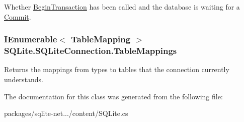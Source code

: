 Whether \hyperlink{classSQLite_1_1SQLiteConnection_aba3becdb524808bd49f349587f1b7049}{Begin\-Transaction} has been called and the database is waiting for a \hyperlink{classSQLite_1_1SQLiteConnection_a2c8187a19b5065f6b23c079e7cca29fe}{Commit}. 

\hypertarget{classSQLite_1_1SQLiteConnection_a72dd4f277b04c171222a199744aef32b}{
\subsubsection[{Table\-Mappings}]{\setlength{\rightskip}{0pt plus 5cm}I\-Enumerable$<$ {\bf Table\-Mapping} $>$ S\-Q\-Lite.\-S\-Q\-Lite\-Connection.\-Table\-Mappings\hspace{0.3cm}{\ttfamily [get]}}}\label{classSQLite_1_1SQLiteConnection_a72dd4f277b04c171222a199744aef32b}


Returns the mappings from types to tables that the connection currently understands. 



The documentation for this class was generated from the following file\-:\begin{DoxyCompactItemize}
\item 
packages/sqlite-\/net.../content/S\-Q\-Lite.\-cs\end{DoxyCompactItemize}

